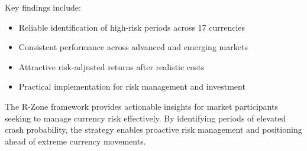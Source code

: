 \documentclass[twocolumn,ieee]{arithmaxresearch}
\begin{document}
Key findings include:
\begin{itemize}
    \item Reliable identification of high-risk periods across 17 currencies
    \item Consistent performance across advanced and emerging markets
    \item Attractive risk-adjusted returns after realistic costs
    \item Practical implementation for risk management and investment
\end{itemize}

The R-Zone framework provides actionable insights for market participants seeking to manage currency risk effectively. By identifying periods of elevated crash probability, the strategy enables proactive risk management and positioning ahead of extreme currency movements.



\end{document}
